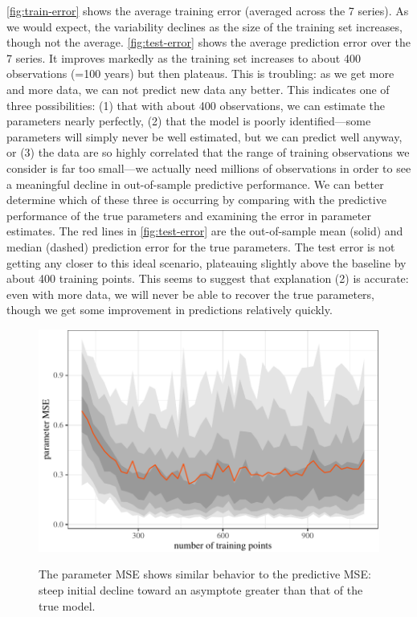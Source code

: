 \documentclass[11pt]{article}
\begin{document}
\autoref{fig:train-error} shows the average training error (averaged
across the 7 series). As we would expect, the variability declines as
the size of the training set increases, though not the average.
\autoref{fig:test-error} shows the average prediction error over the 7
series. It improves markedly as the training set increases to about 400
observations (=100 years) but then plateaus. This is troubling: as we
get more and more data, we can not predict new data any better. This
indicates one of three possibilities: (1) that with about 400
observations, we can estimate the parameters nearly perfectly, (2) that
the model is poorly identified---some parameters will simply never be
well estimated, but we can predict well anyway, or (3) the data are so
highly correlated that the range of training observations we consider is
far too small---we actually need millions of observations in order to
see a meaningful decline in out-of-sample predictive performance. We can
better determine which of these three is occurring by comparing with the
predictive performance of the true parameters and examining the error in
parameter estimates. The red lines in \autoref{fig:test-error} are the
out-of-sample mean (solid) and median (dashed) prediction error for the
true parameters. The test error is not getting any closer to this ideal
scenario, plateauing slightly above the baseline by about 400 training
points. This seems to suggest that explanation (2) is accurate: even
with more data, we will never be able to recover the true parameters,
though we get some improvement in predictions relatively quickly.


\begin{figure}[t]
{\centering \includegraphics{gfx/parm-error-1} }
\caption{The parameter MSE shows similar behavior to the predictive MSE: steep initial decline toward an asymptote greater than that of the true model.}\label{fig:parm-error}
\end{figure}
\end{document}
